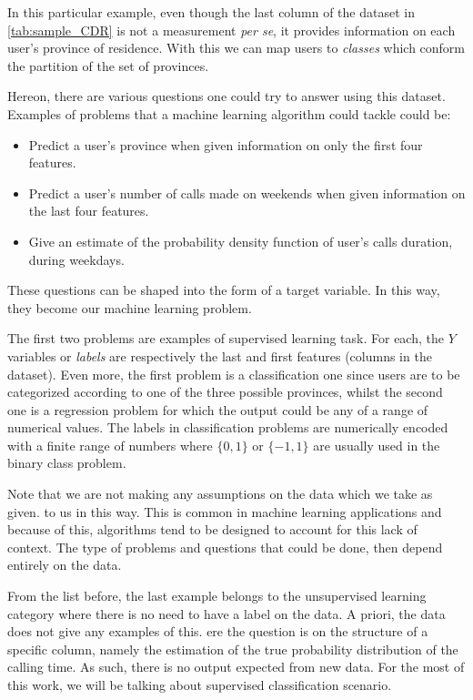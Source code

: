 In this particular example, even though the last column of the dataset in \cref{tab:sample_CDR} is not a measurement \textit{per se}, it provides information on each user's province of residence.
With this we can map users to \textit{classes} which conform the partition of the set of provinces.

Hereon, there are various questions one could try to answer using this dataset.
Examples of problems that a machine learning algorithm could tackle could be:

\begin{itemize}
\item Predict a user's province when given information on only the first four features.
\item Predict a user's number of calls made on weekends when given information on the last four features.
\item Give an estimate of the probability density function of user's calls duration, during weekdays.
\end{itemize}

These questions can be shaped into the form of a target variable.
In this way, they become our machine learning problem.

The first two problems are examples of supervised learning task.
For each, the $Y$ variables or \textit{labels} are respectively the last and first features (columns in the dataset).
Even more, the first problem is a classification one since users are to be categorized according to one of the three possible provinces, whilst the second one is a regression problem for which the output could be any of a range of numerical values.
The labels in classification problems are numerically encoded with a finite range of numbers where $\{0,1\}$ or $\{-1,1\}$ are usually used in the binary class problem.

Note that we are not making any assumptions on the data which we take as given.
to us in this way.
This is common in machine learning applications and because of this, algorithms tend to be designed to account for this lack of context.
The type of problems and questions that could be done, then depend entirely on the data.

From the list before, the last example belongs to the unsupervised learning category where there is no need to have a label on the data.
A priori, the data does not give any examples of this.
ere the question is on the structure of a specific column, namely the estimation of the true probability distribution of the calling time.
As such, there is no output expected from new data.
For the most of this work, we will be talking about supervised classification scenario.

